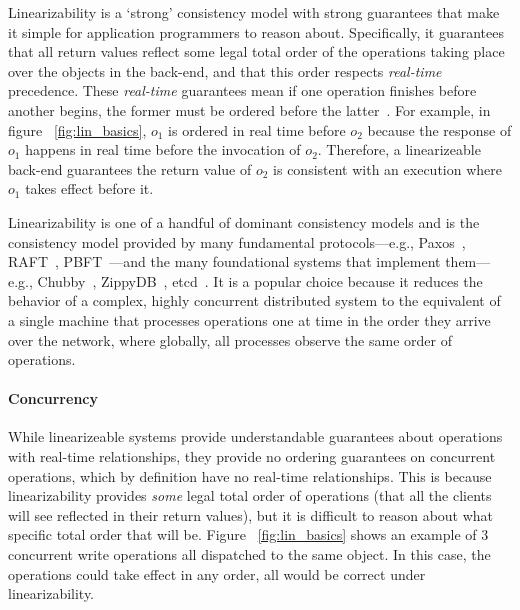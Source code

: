 Linearizability is a `strong' consistency model with strong guarantees that make it simple
for application programmers to reason about. 
Specifically, it guarantees that all return values reflect some legal total order of the operations taking place over the objects in the back-end, and that this order respects \textit{real-time} precedence. These \textit{real-time} guarantees mean if one operation finishes before another begins, the former must be ordered before the latter~\cite{herlihy1987linearizability, herlihy1990linearizability}. For example, in figure ~\ref{fig:lin_basics}, $o_1$ is ordered in real time before $o_2$ because the response of $o_1$ happens in real time before the invocation of $o_2$. Therefore, a linearizeable back-end guarantees the return value of $o_2$ is consistent with an execution where $o_1$ takes effect before it.

Linearizability is one of a handful of dominant consistency models and is the consistency model provided by many fundamental protocols---e.g., Paxos~\cite{lamport1998paxos}, RAFT~\cite{ongaro2014raft}, PBFT~\cite{castro1999pbft}---and the many foundational systems that implement them---e.g., Chubby~\cite{burrows2006chubby}, ZippyDB~\cite{zippyblog}, etcd~\cite{etcd}. It is a popular choice because it reduces the behavior of a complex, highly concurrent distributed system to the equivalent of a single machine that processes operations one at time in the order they arrive over the network, where globally, all processes observe the same order of operations.






\paragraph{Concurrency}
While linearizeable systems provide understandable guarantees about operations with real-time relationships, they provide no ordering guarantees on concurrent operations, which by definition have no real-time relationships. This is because linearizability provides \textit{some} legal total order of operations (that all the clients will see reflected in their return values), but it is difficult to reason about what specific total order that will be. Figure ~\ref{fig:lin_basics} shows an example of 3 concurrent write operations all dispatched to the same object. In this case, the operations could take effect in any order, all would be correct under linearizability. 


